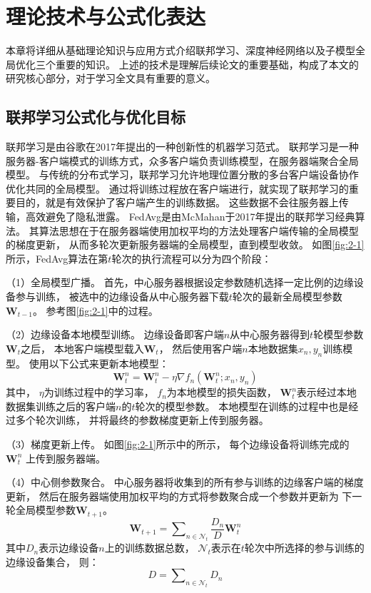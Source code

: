 \chapter{理论技术与公式化表达}
本章将详细从基础理论知识与应用方式介绍联邦学习、深度神经网络以及子模型全局优化三个重要的知识。
上述的技术是理解后续论文的重要基础，构成了本文的研究核心部分，对于学习全文具有重要的意义。

\section{联邦学习公式化与优化目标}
联邦学习\cite{mcmahan2017communication}是由谷歌在2017年提出的一种创新性的机器学习范式。
联邦学习是一种服务器-客户端模式的训练方式，众多客户端负责训练模型，在服务器端聚合全局模型。
与传统的分布式学习，联邦学习允许地理位置分散的多台客户端设备协作优化共同的全局模型。
通过将训练过程放在客户端进行，就实现了联邦学习的重要目的，就是有效保护了客户端产生的训练数据。
这些数据不会往服务器上传输，高效避免了隐私泄露。
FedAvg是由McMahan于2017年提出的联邦学习经典算法。
其算法思想在于在服务器端使用加权平均的方法处理客户端传输的全局模型的梯度更新，
从而多轮次更新服务器端的全局模型，直到模型收敛。
如图\ref{fig:2-1}所示，FedAvg算法在第$t$轮次的执行流程可以分为四个阶段：

（1）全局模型广播。
首先，中心服务器根据设定参数随机选择一定比例的边缘设备参与训练，
被选中的边缘设备从中心服务器下载$t$轮次的最新全局模型参数$\mathbf{W}_{t-1}$。
参考图\ref{fig:2-1}中的过程。

（2）边缘设备本地模型训练。
边缘设备即客户端$n$从中心服务器得到$t$轮模型参数$\mathbf{W}_t$之后，
本地客户端模型载入$\mathbf{W}_t$，
然后使用客户端$n$本地数据集${x_n, y_n}$训练模型。
使用以下公式来更新本地模型：
\begin{equation}
    \mathbf{W}_t^n = \mathbf{W}_t^n  - \eta \nabla f_n(\mathbf{W}_t^n ;x_n, y_n)
\end{equation}
其中，
$\eta $为训练过程中的学习率，
$f_n$为本地模型的损失函数，
$\mathbf{W}_t^n$表示经过本地数据集训练之后的客户端$n$的$t$轮次的模型参数。
本地模型在训练的过程中也是经过多个轮次训练，
并将最终的参数梯度更新上传到服务器。

（3）梯度更新上传。
如图\ref{fig:2-1}所示中的所示，
每个边缘设备将训练完成的$\mathbf{W}_t^n$
上传到服务器端。

（4）中心侧参数聚合。
中心服务器将收集到的所有参与训练的边缘客户端的梯度更新，
然后在服务器端使用加权平均的方式将参数聚合成一个参数并更新为
下一轮全局模型参数$\mathbf{W}_{t+1}$。 
\begin{equation}
    \mathbf{W}_{t+1} =\sum\nolimits_{n \in \mathcal{N}_t} \frac{D_n}{D} \mathbf{W}_t^n
\end{equation}
其中$D_n$表示边缘设备$n$上的训练数据总数，
$\mathcal{N}_t$表示在$t$轮次中所选择的参与训练的边缘设备集合，
则：
\begin{equation}
    D = \sum\nolimits_{n \in \mathcal{N}_t} D_n 
\end{equation}

